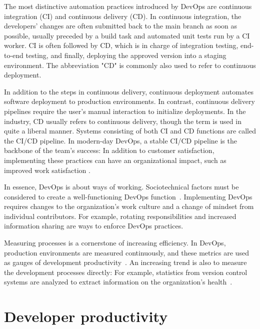 The most distinctive automation practices introduced by DevOps are continuous integration (CI) and continuous delivery (CD). In continuous integration, the developers' changes are often submitted back to the main branch as soon as possible, usually preceded by a build task and automated unit tests run by a CI worker. CI is often followed by CD, which is in charge of integration testing, end-to-end testing, and finally, deploying the approved version into a staging environment. The abbreviation "CD" is commonly also used to refer to continuous deployment. 

In addition to the steps in continuous delivery, continuous deployment automates software deployment to production environments. In contrast, continuous delivery pipelines require the user's manual interaction to initialize deployments. In the industry, CD usually refers to continuous delivery, though the term is used in quite a liberal manner. Systems consisting of both CI and CD functions are called the CI/CD pipeline. In modern-day DevOps, a stable CI/CD pipeline is the backbone of the team's success: In addition to customer satisfaction, implementing these practices can have an organizational impact, such as improved work satisfaction \cite{forsgren_accelerate_2018}. 
 
In essence, DevOps is about ways of working. Sociotechnical factors must be considered to create a well-functioning DevOps function~\cite{hemon-hildgen_agile_2020}. Implementing DevOps requires changes to the organization's work culture and a change of mindset from individual contributors. For example, rotating responsibilities and increased information sharing are ways to enforce DevOps practices.~\cite{lassenius_agile_2015}

Measuring processes is a cornerstone of increasing efficiency. In DevOps, production environments are measured continuously, and these metrics are used as gauges of development productivity~\cite{lassenius_agile_2015}. An increasing trend is also to measure the development processes directly: For example, statistics from version control systems are analyzed to extract information on the organization's health~\cite{forsgren_accelerate_2018}.

\section{Developer productivity}

